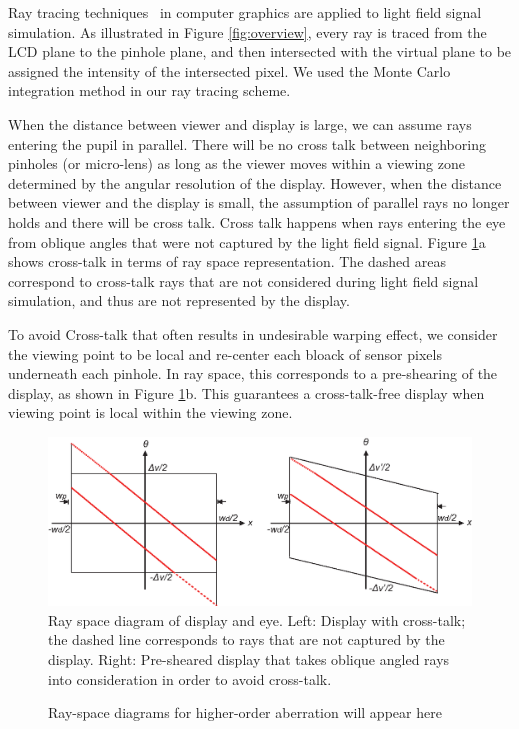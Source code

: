 Ray tracing techniques~\cite{glassner1989introduction} in computer graphics are applied to light field signal simulation. As illustrated in Figure \ref{fig:overview}, every ray is traced from the LCD plane to the pinhole plane, and then intersected with the virtual plane to be assigned the intensity of the intersected pixel. We used the Monte Carlo integration method in our ray tracing scheme.

When the distance between viewer and display is large, we can assume rays entering the pupil in parallel. There will be no cross talk between neighboring pinholes (or micro-lens) as long as the viewer moves within a viewing zone determined by the angular resolution of the display. However, when the distance between viewer and the display is small, the assumption of parallel rays no longer holds and there will be cross talk. Cross talk happens when rays entering the eye from oblique angles that were not captured by the light field signal. Figure \ref{fig:crosstalkDisplay}a shows cross-talk in terms of ray space representation. The dashed areas correspond to cross-talk rays that are not considered during light field signal simulation, and thus are not represented by the display.

To avoid Cross-talk that often results in undesirable warping effect, we consider the viewing point to be local and re-center each bloack of sensor pixels underneath each pinhole. In ray space, this corresponds to a pre-shearing of the display, as shown in Figure \ref{fig:crosstalkDisplay}b. This guarantees a cross-talk-free display when viewing point is local within the viewing zone.

\begin{figure}[t]
	    \begin{center}
   		\includegraphics[width=0.95\linewidth]{images/CrossTalk.eps}
	    \end{center}
	\caption{Ray space diagram of display and eye. Left: Display with cross-talk; the dashed line corresponds to rays that are not captured by the display. Right: Pre-sheared display that takes oblique angled rays into consideration in order to avoid cross-talk.}
\label{fig:crosstalkDisplay}
\end{figure}

\begin{figure}
    \begin{center}
        \fbox{\rule{0pt}{2in} \rule{.45\linewidth}{0pt}}
    \end{center}
    \caption{Ray-space diagrams for higher-order aberration will appear here}
    \label{fig:rayspace_highorderaberration}
\end{figure}

